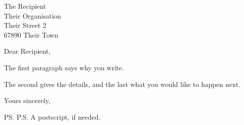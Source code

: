 \documentclass[11pt]{letter}
\begin{document}
\begin{letter}{The Recipient \\ Their Organisation \\ Their Street 2 \\ 67890 Their Town}

\opening{Dear Recipient,}

The first paragraph says why you write.

The second gives the details, and the last what you would like to happen next.

\closing{Yours sincerely,}

\ps{P.S. A postscript, if needed.}

\end{letter}
\end{document}
